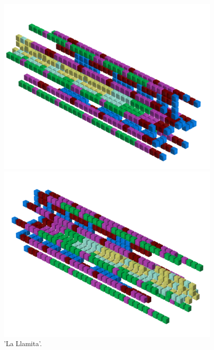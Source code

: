 \begin{figure}[H]
    \centering
    \begin{adjustbox}{width=12cm,center}
      \includegraphics[width=12cm]{src/patterns/pattern9-45.png}%
    \end{adjustbox}
    \begin{adjustbox}{width=12cm,margin=0cm -4cm}
      \includegraphics[width=12cm]{src/patterns/pattern9-225.png}%
    \end{adjustbox}
\caption{'La Llamita'.}
\end{figure}
\clearpage

